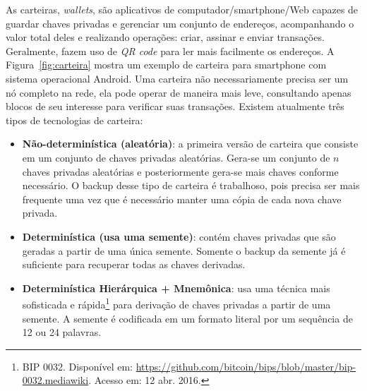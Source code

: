 As carteiras, \textit{wallets}, são aplicativos de computador/smartphone/Web capazes de guardar chaves privadas e gerenciar um conjunto de endereços, acompanhando o valor total deles e realizando operações: criar, assinar e enviar transações. Geralmente, fazem uso de \textit{QR code} para ler mais facilmente os endereços. A Figura~\ref{fig:carteira} mostra um exemplo de carteira para smartphone com sistema operacional Android. Uma carteira não necessariamente precisa ser um nó completo na rede, ela pode operar de maneira mais leve, consultando apenas blocos de seu interesse para verificar suas transações. Existem atualmente três tipos de tecnologias de carteira:
\begin{itemize}
	\item \textbf{Não-determinística (aleatória)}: a primeira versão de carteira que consiste em um conjunto de chaves privadas aleatórias. Gera-se um conjunto de $n$ chaves privadas aleatórias e posteriormente gera-se mais chaves conforme necessário. O backup desse tipo de carteira é trabalhoso, pois precisa ser mais frequente uma vez que é necessário manter uma cópia de cada nova chave privada.

	\item \textbf{Determinística (usa uma semente)}: contém chaves privadas que são geradas a partir de uma única semente. Somente o backup da semente já é suficiente para recuperar todas as chaves derivadas.
	
	\item \textbf{Determinística Hierárquica + Mnemônica}: usa uma técnica mais sofisticada e rápida\footnote{BIP 0032. Disponível em: \url{https://github.com/bitcoin/bips/blob/master/bip-0032.mediawiki}. Acesso em: 12 abr. 2016.} para derivação de chaves privadas a partir de uma semente. A semente é codificada em um formato literal por um sequência de 12 ou 24 palavras.
\end{itemize}

